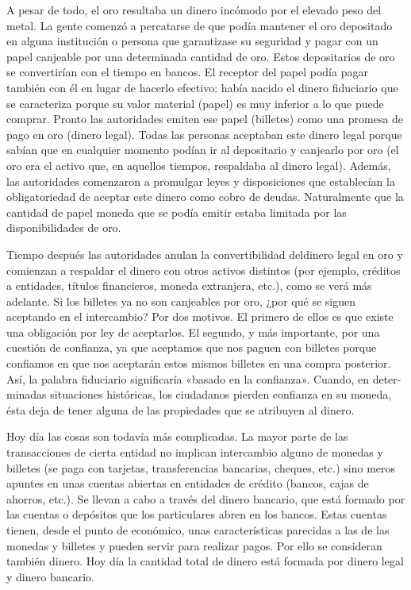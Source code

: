 \documentclass[
]{krantz}
\begin{document}
A pesar de todo, el oro resultaba un dinero incómodo por el elevado peso del metal. La gente comenzó a percatarse de que podía mantener el oro depositado en alguna institución o persona que garantizase su seguridad y pagar con un papel canjeable por una determinada cantidad de oro. Estos depositarios de oro se convertirían con el tiempo en bancos. El receptor del papel podía pagar también con él en lugar de hacerlo efectivo: había nacido el dinero ﬁduciario que se caracteriza porque su valor material (papel) es muy inferior a lo que puede comprar. Pronto las autoridades emiten ese papel (billetes) como una promesa de pago en oro (dinero legal). Todas las personas aceptaban este dinero legal porque sabían que en cualquier momento podían ir al depositario y canjearlo por oro (el oro era el activo que, en aquellos tiempos, respaldaba al dinero legal). Además, las autoridades comenzaron a promulgar leyes y disposiciones que establecían la obligatoriedad de aceptar este dinero como cobro de deudas. Naturalmente que la cantidad de papel moneda que se podía emitir estaba limitada por las disponibilidades de oro.

Tiempo después las autoridades anulan la convertibilidad deldinero legal en oro y comienzan a respaldar el dinero con otros activos distintos (por ejemplo, créditos a entidades, títulos financieros, moneda extranjera, etc.), como se verá más adelante. Si los billetes ya no son canjeables por oro, ¿por qué se siguen aceptando en el intercambio? Por dos motivos. El primero de ellos es que existe una obligación por ley de aceptarlos. El segundo, y más importante, por una cuestión de conﬁanza, ya que aceptamos que nos paguen con billetes porque conﬁamos en que nos aceptarán estos mismos billetes en una compra posterior. Así, la palabra fiduciario signiﬁcaría «basado en la conﬁanza». Cuando, en deter- minadas situaciones históricas, los ciudadanos pierden conﬁanza en su moneda, ésta deja de tener alguna de las propiedades que se atribuyen al dinero.

Hoy día las cosas son todavía más complicadas. La mayor parte de las transacciones de cierta entidad no implican intercambio alguno de monedas y billetes (se paga con tarjetas, transferencias bancarias, cheques, etc.) sino meros apuntes en unas cuentas abiertas en entidades de crédito (bancos, cajas de ahorros, etc.). Se llevan a cabo a través del dinero bancario, que está formado por las cuentas o depósitos que los particulares abren en los bancos. Estas cuentas tienen, desde el punto de económico, unas características parecidas a las de las monedas y billetes y pueden servir para realizar pagos. Por ello se consideran también dinero. Hoy día la cantidad total de dinero está formada por dinero legal y dinero bancario.
\end{document}
